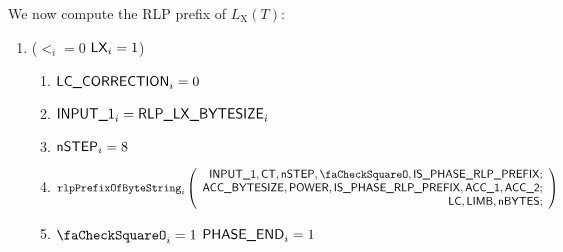 We now compute the RLP prefix of $L_{\mathrm{X}}(T)$:
\begin{enumerate}[resume]
	\item \If ($\lt_{i}=0$ \et $\textsf{LX}_{i}=1$) \Then
	\begin{enumerate}
		\item $\textsf{LC\_CORRECTION}_{i}=0$
		\item $\textsf{INPUT\_1}_{i} = \textsf{RLP\_LX\_BYTESIZE}_{i}$
		\item $\textsf{nSTEP}_{i}=8$
		\item 
				\[
					\rlpPrefixByteString_{i}
					\left(
					\begin{array}{r}
						\Input1,
						\ct,
						\nbstep,
						\done,
						\phaseRlpPrefix{}; \\
						\accsize,
						\Power,
						\phaseRlpPrefix,
						\acc1,
						\acc2; \\
						\lc,
						\limb,
						\limbsize; \\
					\end{array}
					\right)
				\]
		\item \If $\done_{i}=1$ \Then $\textsf{PHASE\_END}_{i}=1$
	\end{enumerate}
\end{enumerate}
